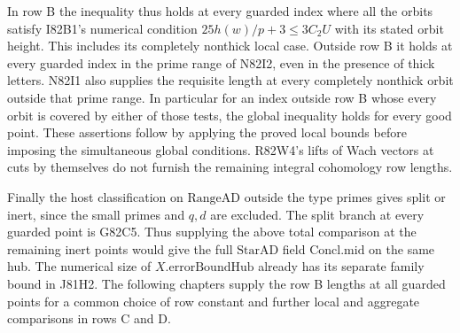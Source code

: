 In row B the inequality thus holds at every guarded index where
all the orbits satisfy I82B1's numerical condition
$25h(w)/p+3\le3C_2 U$ with its stated orbit height. This includes
its completely nonthick local case. Outside row B it holds at
every guarded index in the prime range of N82I2, even in the
presence of thick letters. N82I1 also supplies the requisite
length at every completely nonthick orbit outside that prime
range. In particular for an index outside row B whose every
orbit is covered by either of those tests, the global inequality
holds for every good point. These assertions follow by applying
the proved local bounds before imposing the simultaneous global
conditions. R82W4's lifts of Wach vectors at cuts by themselves
do not furnish the remaining integral cohomology row lengths.

Finally the host classification on $\mathrm{RangeAD}$ outside
the type primes gives split or inert, since the small primes and
$q,d$ are excluded. The split branch at every guarded point is
G82C5. Thus supplying the above total comparison at the remaining
inert points would give the full $\mathrm{StarAD}$ field
$\mathrm{Concl.mid}$ on the same hub. The numerical size of
$X.\mathrm{errorBoundHub}$ already has its separate family bound
in J81H2. The following chapters supply the row B lengths at all guarded
points for a common choice of row constant and further local
and aggregate comparisons in rows C and D.

